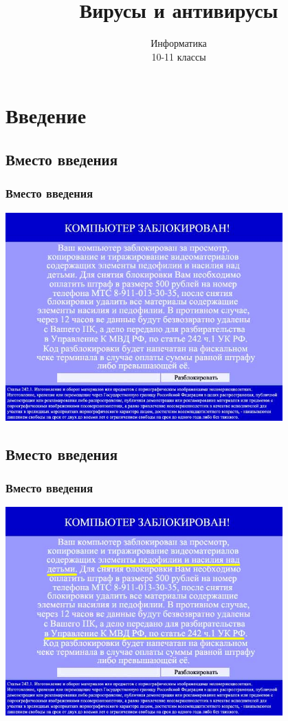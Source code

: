 \documentclass[compress,red]{beamer}
\title{Вирусы и антивирусы}
\author{Информатика \\ 10-11 классы}
\begin{document}
\maketitle

\section{Введение}
\subsection{Вместо введения}
\begin{frame}
\frametitle{Вместо введения}
  \centerline{\includegraphics[width=0.8\textwidth]{images/winlocker.jpg}}
\end{frame}

\subsection{Вместо введения}
\begin{frame}
\frametitle{Вместо введения}
  \centerline{\includegraphics[width=0.8\textwidth]{images/winlocker2.jpg}}
\end{frame}
\end{document}

